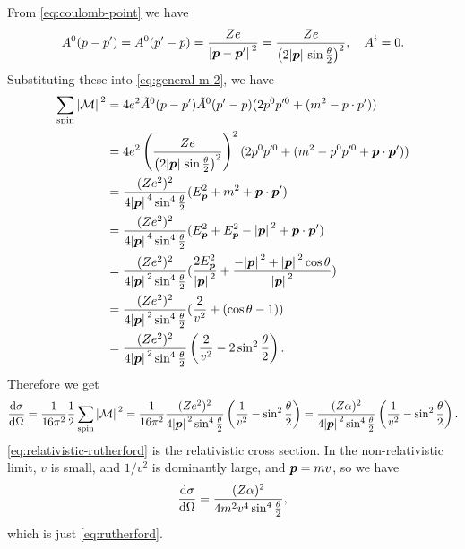 \documentclass[hyperref, a4paper]{article}
\begin{document}
\begin{itemize}
From \eqref{eq:coulomb-point} we have 
\[
    A^0(p - p') = A^0(p' - p) = \frac{Ze}{ \abs*{\vb*{p} - \vb*{p}'}^2} = \frac{Ze}{ \left( 2 \abs*{\vb*{p}} \sin \frac{\theta}{2} \right)^2}, \quad A^i = 0.
\]
Substituting these into \eqref{eq:general-m-2}, we have 
\[
    \begin{aligned}
        \sum_\text{spin} \abs*{\mathcal{M}}^2 &= 4 e^2 \tilde{A}^0(p - p') \tilde{A}^0(p' - p) (2 p^0 p'^0 + (m^2 - p \cdot p') ) \\
        &= 4 e^2 \left( \frac{Ze}{ \left( 2 \abs*{\vb*{p}} \sin \frac{\theta}{2} \right)^2} \right)^2 (2 p^0 p'^0 + (m^2 - p^0 p'^0 + \vb*{p} \cdot \vb*{p}') ) \\
        &= \frac{(Z e^2)^2}{4 \abs*{\vb*{p}}^4 \sin^4 \frac{\theta}{2} } (E_{\vb*{p}}^2 + m^2 + \vb*{p} \cdot \vb*{p}') \\
        &= \frac{(Z e^2)^2}{4 \abs*{\vb*{p}}^4 \sin^4 \frac{\theta}{2} } (E_{\vb*{p}}^2 + E_{\vb*{p}}^2 - \abs*{\vb*{p}}^2 + \vb*{p} \cdot \vb*{p}') \\
        &= \frac{(Z e^2)^2}{4 \abs*{\vb*{p}}^2  \sin^4 \frac{\theta}{2} } ( \frac{2 E_{\vb*{p}}^2}{\abs*{\vb*{p}}^2} + \frac{- \abs*{\vb*{p}}^2 + \abs*{\vb*{p}}^2 \cos \theta }{\abs*{\vb*{p}}^2} ) \\
        &= \frac{(Z e^2)^2}{4 \abs*{\vb*{p}}^2 \sin^4 \frac{\theta}{2} } ( \frac{2}{v^2} + (\cos \theta - 1) ) \\
        &=  \frac{(Z e^2)^2}{4 \abs*{\vb*{p}}^2 \sin^4 \frac{\theta}{2} } \left( \frac{2}{v^2} - 2 \sin^2 \frac{\theta}{2} \right). 
    \end{aligned}
\]
Therefore we get 
\begin{equation}
    \dv{\sigma}{\Omega} = \frac{1}{16 \pi^2} \frac{1}{2} \sum_\text{spin} \abs*{\mathcal{M}}^2 = \frac{1}{16 \pi^2} \frac{(Z e^2)^2}{ 4 \abs*{\vb*{p}}^2 \sin^4 \frac{\theta}{2} } \left( \frac{1}{v^2} - \sin^2 \frac{\theta}{2} \right) = \frac{(Z \alpha)^2}{4 \abs*{\vb*{p}}^2 \sin^4 \frac{\theta}{2}} \left( \frac{1}{v^2} - \sin^2 \frac{\theta}{2} \right).
    \label{eq:relativistic-rutherford}
\end{equation}
\eqref{eq:relativistic-rutherford} is the relativistic cross section. In the non-relativistic limit, $v$ is small,
and $1 / v^2$ is dominantly large, and $\vb*{p} = mv$, so we have 
\begin{equation}
    \dv{\sigma}{\Omega} = \frac{(Z \alpha)^2}{ 4 m^2 v^4 \sin^4 \frac{\theta}{2} },
\end{equation}
which is just \eqref{eq:rutherford}.

\end{itemize}
\end{document}
